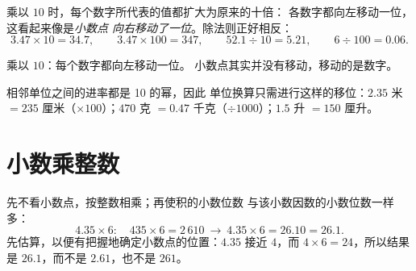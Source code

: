 \begin{proposition}[乘以和除以 10、100、1000]\label{prop:g5:decimalops:shift}
乘以 $10$ 时，每个数字所代表的值都扩大为原来的十倍：
各数字都向左移动一位，这看起来像是\emph{小数点
向右移动了一位}。除法则正好相反：
\[
3.47 \times 10 = 34.7, \qquad
3.47 \times 100 = 347, \qquad
52.1 \div 10 = 5.21, \qquad
6 \div 100 = 0.06 .
\]
\end{proposition}
\admitted

\begin{omfigure}

{\small 乘以 $10$：每个数字都向左移动一位。
小数点其实并没有移动，移动的是数字。}
\end{omfigure}

\begin{example}[再谈单位换算]\label{ex:g5:decimalops:convert}
相邻单位之间的进率都是 10 的幂，因此
单位换算只需进行这样的移位：$2.35$ 米 $= 235$ 厘米（$\times 100$）；$470$ 克
$= 0.47$ 千克（$\div 1000$）；$1.5$ 升 $= 150$ 厘升。
\end{example}

\section{小数乘整数}

\begin{method}[小数乘整数]\label{met:g5:decimalops:mult}
先不看小数点，按整数相乘；再使积的小数位数
与该小数因数的小数位数一样多：
\[
4.35 \times 6: \quad 435 \times 6 = 2\,610
\ \to\ 4.35 \times 6 = 26.10 = 26.1 .
\]
先估算，以便有把握地确定小数点的位置：$4.35$ 接近
$4$，而 $4 \times 6 = 24$，所以结果是 $26.1$，而不是 $2.61$，也不是 $261$。
\end{method}

